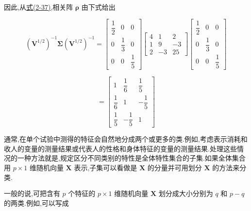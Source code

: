 因此,从\hyperref[eq:2-37]{式(2-37)},相关阵 $\bm{\rho}$ 由下式给出

\[
(\bm{V}^{1/2})^{-1}\bm{\Sigma}(\bm{V}^{1/2})^{-1}=\begin{bmatrix}\dfrac{1}{2} & 0 & 0\\[2ex]0 & \dfrac{1}{3} & 0\\[2ex]0 & 0 & \dfrac{1}{5}\end{bmatrix}\begin{bmatrix}4 & 1 & 2\\1 & 9 & -3\\2 & -3 & 25\end{bmatrix}\begin{bmatrix}\dfrac{1}{2} & 0 & 0\\[2ex]0 & \dfrac{1}{3} & 0\\[2ex]0 & 0 & \dfrac{1}{5}\end{bmatrix}
\]

\[
=\begin{bmatrix}1 & \dfrac{1}{6} & \dfrac{1}{5}\\[2ex]\dfrac{1}{6} & 1 & -\dfrac{1}{5}\\[2ex]\dfrac{1}{5} & -\dfrac{1}{5} & 1\end{bmatrix}
\]


通常,在单个试验中测得的特征会自然地分成两个或更多的类.例如,考虑表示消耗和收人的变量的测量结果或代表人的性格和身体特征的变量的测量结果.处理这些情况的一种方法就是,规定区分不同类别的特性是全体特性集合的子集.如果全体集合用 $p\times 1$ 维随机向量 $\bm{X}$ 表示,子集可以看做是 $\bm{X}$ 的分量并可用划分 $\bm{X}$ 的方法来分类.

一般的说,可把含有 $p$ 个特征的 $p\times 1$ 维随机向量 $\bm{X}$ 划分成大小分别为 $q$ 和 $p-q$ 的两类.例如,可以写成
